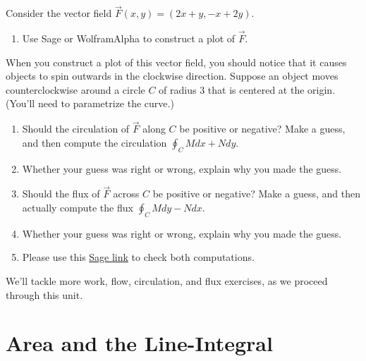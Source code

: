 \begin{problem}
%
\indent Consider the vector field $\vec F(x,y) = (2x+y,-x+2y)$. 
\begin{enumerate}
	\item Use Sage or WolframAlpha to construct a plot of $\vec F$.
\end{enumerate}
When you construct a plot of this vector field, you should notice that it causes objects to spin outwards in the clockwise direction. Suppose an object moves counterclockwise around a circle $C$ of radius 3 that is centered at the origin. (You'll need to parametrize the curve.)
\begin{enumerate}[resume]
	\item Should the circulation of $\vec F$ along $C$ be positive or negative?  Make a guess, and then compute the circulation $\oint_C Mdx+Ndy$. 
	\item Whether your guess was right or wrong, explain why you made the guess. 
	\item Should the flux of $\vec F$ across $C$ be positive or negative? Make a guess, and then actually compute the flux $\oint_C Mdy-Ndx$. 
	\item Whether your guess was right or wrong, explain why you made the guess. 
	\item Please use this \href{\sageworkfluxurl}{Sage link} to check both computations. 
\end{enumerate}
\end{problem}

We'll tackle more work, flow, circulation, and flux exercises, as we proceed through this unit.


\section{Area and the Line-Integral}

